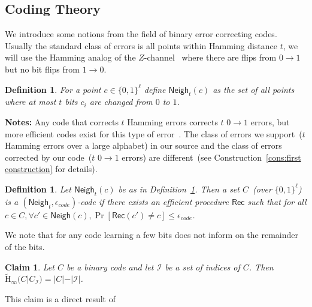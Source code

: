 \documentclass[11pt]{article}
\newcommand{\defref}[1]{\mbox{Definition~\ref{#1}}}
\newcommand{\consref}[1]{\mbox{Construction~\ref{#1}}}
\newcommand{\class}[1]{{\ensuremath{\mathsf{#1}}}}
\newcommand{\rec}{\ensuremath{\class{Rec}}\xspace}
\newcommand{\zo}{\ensuremath{\{0, 1\}}}
\newcommand{\neigh}{\ensuremath{\class{Neigh}}\xspace}
\newcommand{\Hav}{\tilde{\mathrm{H}}_\infty}
\newtheorem{definition}[theorem]{Definition}
\newtheorem{claim}[theorem]{Claim}
\begin{document}
\subsection{Coding Theory}
\label{sec:coding theory}
We introduce some notions from the field of binary error correcting codes.  Usually the standard class of errors  is all points within Hamming distance $t$, we will use the Hamming analog of the $Z$-channel~\cite{tallini2002capacity} where there are flips from $0\rightarrow 1$ but no bit flips from $1\rightarrow 0$.  
\begin{definition}
\label{def:hamming z channel}
For a point $c\in \zo^\ell$ define $\neigh_t(c) $ as the set of all points where at most $t$ bits $c_i$ are changed from $0$ to $1$. 
\end{definition}
\textbf{Notes:} Any code that corrects $t$ Hamming errors corrects $t$ $0\rightarrow 1$ errors, but more efficient codes  exist for this type of error~\cite{tallini2002capacity}.
The class of errors we support~($t$ Hamming errors over a large alphabet) in our source and the class of errors corrected by our code~($t$ $0\rightarrow 1$ errors) are different~(see \consref{cons:first construction} for details).

\begin{definition}
Let $\neigh_t(c)$ be as in \defref{def:hamming z channel}.  Then a set $C$~(over $\zo^\ell$) is a $(\neigh_t, \epsilon_{code})$-code if there exists an efficient procedure $\rec$ such that for all $c\in C, \forall c'\in \neigh(c), \Pr[\rec(c') \neq c] \leq \epsilon_{code}$.
\end{definition}

We note that for any code learning a few bits does not inform on the remainder of the bits.  

\begin{claim} 
\label{cl:many locations ent}
Let $C$ be a binary code and let $\mathcal{I}$ be a set of indices of $C$.  Then $\Hav(C | C_\mathcal{I}) = |C| - |\mathcal{I}|$.
\end{claim}
This claim is a direct result of \cite[Lemma 2.2b]{DBLP:journals/siamcomp/DodisORS08}

\end{document}
